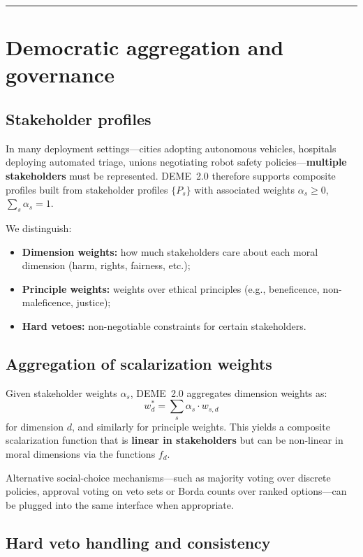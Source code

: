 \documentclass[11pt]{article}
\begin{document}
\hrule
\vspace{1em}

\section{Democratic aggregation and governance}

\subsection{Stakeholder profiles}

In many deployment settings---cities adopting autonomous vehicles, hospitals deploying automated triage, unions negotiating robot safety policies---\textbf{multiple stakeholders} must be represented. DEME~2.0 therefore supports composite profiles built from stakeholder profiles $\{P_s\}$ with associated weights $\alpha_s \ge 0$, $\sum_s \alpha_s = 1$.

We distinguish:
\begin{itemize}
  \item \textbf{Dimension weights:} how much stakeholders care about each moral dimension (harm, rights, fairness, etc.);
  \item \textbf{Principle weights:} weights over ethical principles (e.g., beneficence, non-maleficence, justice);
  \item \textbf{Hard vetoes:} non-negotiable constraints for certain stakeholders.
\end{itemize}

\subsection{Aggregation of scalarization weights}

Given stakeholder weights $\alpha_s$, DEME~2.0 aggregates dimension weights as:
\[
  w_d^* = \sum_s \alpha_s \cdot w_{s,d}
\]
for dimension $d$, and similarly for principle weights. This yields a composite scalarization function that is \textbf{linear in stakeholders} but can be non-linear in moral dimensions via the functions $f_d$.

Alternative social-choice mechanisms---such as majority voting over discrete policies, approval voting on veto sets or Borda counts over ranked options---can be plugged into the same interface when appropriate.

\subsection{Hard veto handling and consistency}
\end{document}
